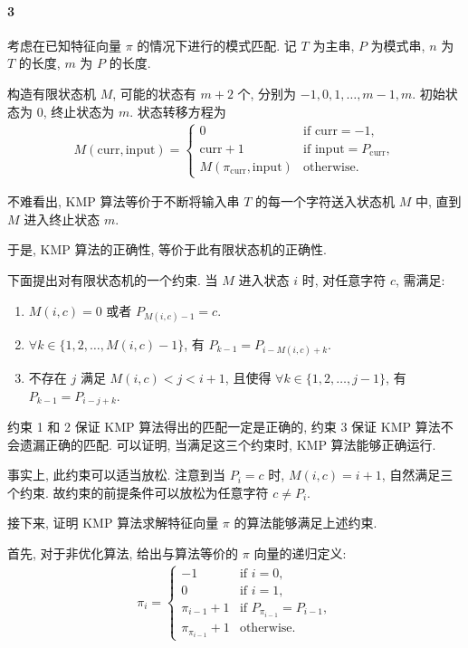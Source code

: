 \documentclass{ctexart}
\begin{document}
\newpage

\paragraph*{3} 考虑在已知特征向量 $\pi$ 的情况下进行的模式匹配.
记 $T$ 为主串, $P$ 为模式串, $n$ 为 $T$ 的长度, $m$ 为 $P$ 的长度.

构造有限状态机 $M$, 可能的状态有 $m+2$ 个,
分别为 $-1, 0, 1, \ldots, m-1, m$.
初始状态为 $0$, 终止状态为 $m$.
状态转移方程为
\begin{gather*}
    M(\mathrm{curr}, \mathrm{input}) = \begin{cases}
        0                                      & \textrm{if } \mathrm{curr} = -1,                 \\
        \mathrm{curr} + 1                      & \textrm{if } \mathrm{input} = P_{\mathrm{curr}}, \\
        M(\pi_{\mathrm{curr}}, \mathrm{input}) & \textrm{otherwise}.
    \end{cases}
\end{gather*}

不难看出, KMP 算法等价于不断将输入串 $T$ 的每一个字符送入状态机 $M$ 中,
直到 $M$ 进入终止状态 $m$.

于是, KMP 算法的正确性, 等价于此有限状态机的正确性.

下面提出对有限状态机的一个约束.
当 $M$ 进入状态 $i$ 时, 对任意字符 $c$, 需满足:
\begin{enumerate}[nosep, left=4em]
    \item $M(i,c) = 0$ 或者 $P_{M(i,c)-1}=c$.
    \item $\forall k \in \{1,2, \ldots, M(i,c)-1\}$, 有 $P_{k-1}=P_{i-M(i,c)+k}$.
    \item 不存在 $j$ 满足 $M(i,c) < j < i+1$,
          且使得 $\forall k\in\{1,2,\ldots, j-1\}$, 有 $P_{k-1}=P_{i-j+k}$.
\end{enumerate}

约束 1 和 2 保证 KMP 算法得出的匹配一定是正确的,
约束 3 保证 KMP 算法不会遗漏正确的匹配.
可以证明, 当满足这三个约束时, KMP 算法能够正确运行.

事实上, 此约束可以适当放松. 注意到当 $P_i=c$ 时, $M(i,c)=i+1$,
自然满足三个约束. 故约束的前提条件可以放松为任意字符 $c\ne P_i$.

接下来, 证明 KMP 算法求解特征向量 $\pi$ 的算法能够满足上述约束.

首先, 对于非优化算法, 给出与算法等价的 $\pi$ 向量的递归定义:
\begin{gather*}
    \pi_i = \begin{cases}
        -1                & \textrm{if } i=0,                     \\
        0                 & \textrm{if } i=1,                     \\
        \pi_{i-1}+1       & \textrm{if } P_{\pi_{i-1}} = P_{i-1}, \\
        \pi_{\pi_{i-1}}+1 & \textrm{otherwise}.
    \end{cases}
\end{gather*}
\end{document}
